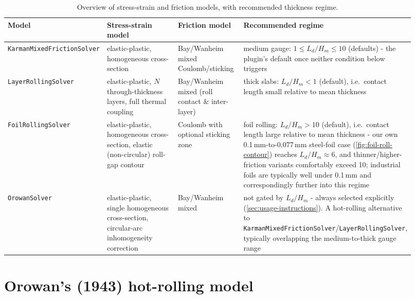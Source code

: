 \documentclass[11pt]{PyRollDocs}
\begin{document}
    \begin{table}
        \centering
        \caption{Overview of stress-strain and friction models, with recommended thickness regime.}
        \label{tab:model-overview}
        \begin{tabular}{@{}p{0.15\linewidth}p{0.24\linewidth}p{0.17\linewidth}p{0.36\linewidth}@{}}
            \toprule
            Model & Stress-strain model & Friction model & Recommended regime \\
            \midrule
            \texttt{Karman\-Mixed\-Friction\-Solver} &
            elastic-plastic, homogeneous cross-section &
            Bay/Wanheim mixed Coulomb/sticking &
            medium gauge: $1 \leq L_d/H_m \leq 10$ (defaults) - the plugin's default once neither condition below triggers \\
            \addlinespace
            \texttt{Layer\-Rolling\-Solver} &
            elastic-plastic, $N$ through-thickness layers, full thermal coupling &
            Bay/Wanheim mixed (roll contact \& inter-layer) &
            thick slabs: $L_d/H_m < 1$ (default), i.e.\ contact length small relative to mean thickness \\
            \addlinespace
            \texttt{Foil\-Rolling\-Solver} &
            elastic-plastic, homogeneous cross-section, elastic (non-circular) roll-gap contour &
            Coulomb with optional sticking zone &
            foil rolling: $L_d/H_m > 10$ (default), i.e.\ contact length large relative to mean thickness - our own 0.1\,mm-to-0.077\,mm steel-foil case (\autoref{fig:foil-roll-contour}) reaches $L_d/H_m \approx 6$, and thinner/higher-friction variants comfortably exceed 10; industrial foils are typically well under 0.1\,mm and correspondingly further into this regime \\
            \addlinespace
            \texttt{Orowan\-Solver} &
            elastic-plastic, single homogeneous cross-section, circular-arc inhomogeneity correction &
            Bay/Wanheim mixed &
            not gated by $L_d/H_m$ - always selected explicitly (\autoref{sec:usage-instructions}). A hot-rolling alternative to \texttt{Karman\-Mixed\-Friction\-Solver}/\texttt{Layer\-Rolling\-Solver}, typically overlapping the medium-to-thick gauge range \\
            \bottomrule
        \end{tabular}
    \end{table}


    \section{Orowan's (1943) hot-rolling model}\label{sec:orowan-model}
\end{document}
